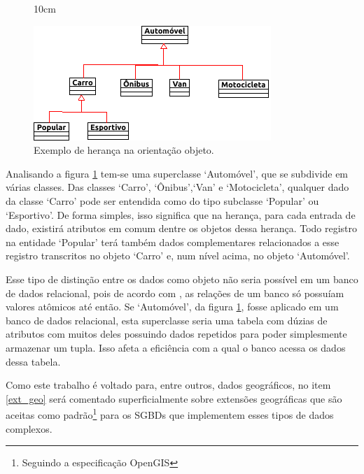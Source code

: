 \begin{figure}[!ht]{10cm}
  \caption{Exemplo de herança na orientação objeto.} \label{heranca_obj}
  \includegraphics[width=1\hsize]{figuras/heranca.png}
\end{figure}

Analisando a figura \ref{heranca_obj} tem-se uma superclasse `Automóvel', que se subdivide em várias classes. Das classes `Carro', `Ônibus',`Van' e `Motocicleta', qualquer dado da classe `Carro' pode ser entendida como do tipo subclasse `Popular' ou `Esportivo'.  De forma simples, isso significa que na herança, para cada entrada de dado, existirá atributos em comum dentre os objetos dessa herança. Todo registro na entidade `Popular' terá também dados complementares relacionados a esse registro transcritos no objeto `Carro' e, num nível acima, no objeto `Automóvel'. 

Esse tipo de distinção entre os dados como objeto não seria possível em um banco de dados relacional, pois de acordo com , as relações de um banco só possuíam valores atômicos até então.
Se `Automóvel', da figura \ref{heranca_obj}, fosse aplicado em um banco de dados relacional, esta superclasse seria uma tabela com dúzias de atributos com muitos deles possuindo dados repetidos para poder simplesmente armazenar um tupla. Isso afeta a eficiência com a qual o banco acessa os dados dessa tabela.

Como este trabalho é voltado para, entre outros, dados geográficos, no item \ref{ext_geo} será comentado superficialmente sobre extensões geográficas que são aceitas como padrão\footnote{Seguindo a especificação OpenGIS\cite{opengis}} para os SGBDs que implementem esses tipos de dados complexos. 



